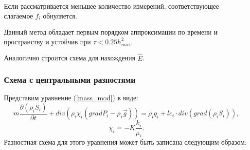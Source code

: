 Если рассматривается меньшее количество измерений,
соответствующее слагаемое $f_i$ обнуляется.

Данный метод обладает первым порядком аппроксимации по времени
и пространству и устойчив при $\tau < 0.25 h_{min}^2$.

Аналогично строится схема для нахождения $\widehat{E}$.

\subsubsection*{Схема с центральными разностями}

Представим уравнение (\ref{mass_mod}) в виде:
 \begin{equation}
 	 m \frac{\partial (\rho_i S_i)}{\partial t}+ div(\rho_i \chi_i (grad P_i - {\rho}_i\overrightarrow{g})) = \rho_i q_i + l c_i \cdot div(grad(\rho_i S_i)),
 \end{equation}
 $$\chi_i=-K\frac{k_i}{\mu_i}.$$
Разностная схема для этого уравнения может быть записана следующим
образом:

